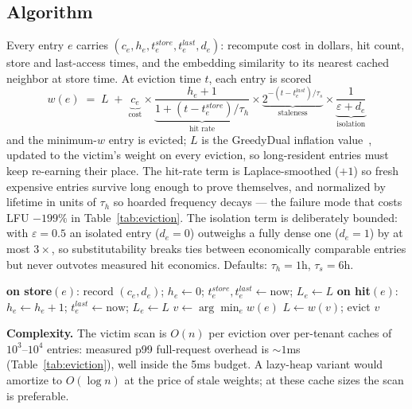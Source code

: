 \subsection{Algorithm}
Every entry $e$ carries $(c_e, h_e, t^{store}_e, t^{last}_e, d_e)$:
recompute cost in dollars, hit count, store and last-access times, and
the embedding similarity to its nearest cached neighbor at store time.
At eviction time $t$, each entry is scored
%
\begin{equation}
  w(e) \;=\; L \;+\; \underbrace{c_e}_{\text{cost}}
  \times \underbrace{\frac{h_e + 1}{1 + (t - t^{store}_e)/\tau_h}}_{\text{hit rate}}
  \times \underbrace{2^{-(t - t^{last}_e)/\tau_s}}_{\text{staleness}}
  \times \underbrace{\frac{1}{\varepsilon + d_e}}_{\text{isolation}}
  \label{eq:eviction-weight}
\end{equation}
%
and the minimum-$w$ entry is evicted; $L$ is the GreedyDual inflation
value~\cite{cao1997greedydual}, updated to the victim's weight on every
eviction, so long-resident entries must keep re-earning their place. The
hit-rate term is Laplace-smoothed ($+1$) so fresh expensive entries
survive long enough to prove themselves, and normalized by lifetime in
units of $\tau_h$ so hoarded frequency decays --- the failure mode that
costs LFU $-199\%$ in Table~\ref{tab:eviction}. The isolation term is
deliberately bounded: with $\varepsilon = 0.5$ an isolated entry
($d_e{=}0$) outweighs a fully dense one ($d_e{=}1$) by at most
$3\times$, so substitutability breaks ties between economically
comparable entries but never outvotes measured hit economics. Defaults:
$\tau_h = 1$h, $\tau_s = 6$h.

\begin{algorithm}[t]
\caption{Cost-aware eviction (per tenant)}
\label{alg:eviction}
\begin{algorithmic}[1]
\State \textbf{on store}$(e)$: record $(c_e, d_e)$;
  $h_e \gets 0$; $t^{store}_e, t^{last}_e \gets \text{now}$;
  $L_e \gets L$
\State \textbf{on hit}$(e)$: $h_e \gets h_e + 1$;
  $t^{last}_e \gets \text{now}$; $L_e \gets L$
  \State $v \gets \arg\min_{e} w(e)$
  \State $L \gets w(v)$; evict $v$
\EndWhile
\end{algorithmic}
\end{algorithm}

\textbf{Complexity.} The victim scan is $O(n)$ per eviction over
per-tenant caches of $10^3$--$10^4$ entries: measured p99 full-request
overhead is ${\sim}1$ms (Table~\ref{tab:eviction}), well inside the 5ms
budget. A lazy-heap variant would amortize to $O(\log n)$ at the price
of stale weights; at these cache sizes the scan is preferable.

